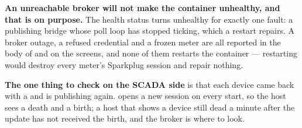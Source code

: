 \begin{note}
\textbf{An unreachable broker will not make the container unhealthy, and that is on purpose.}
The health status turns unhealthy for exactly one fault: a publishing bridge whose poll loop
has stopped ticking, which a restart repairs. A broker outage, a refused credential and a
frozen meter are all reported in the body of  and on the screens, and none of
them restarts the container --- restarting would destroy every meter's Sparkplug session and
repair nothing.
\end{note}

\begin{note}
\textbf{The one thing to check on the SCADA side} is that each device came back with a
 and is publishing again. \prog opens a new session on every start, so the host
sees a death and a birth; a host that shows a device still dead a minute after the update has
not received the birth, and the broker is where to look.
\end{note}
